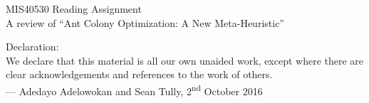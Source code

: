 \documentclass[a4paper,10pt]{minimal}
\begin{document}
\noindent
MIS40530 Reading Assignment
\\A review of ``Ant Colony Optimization: A New Meta-Heuristic''

\vspace{3in}
\noindent
Declaration:
\vspace{0.125in}
\noindent
\\We declare that this material is all our own unaided work, except where there are clear acknowledgements and references to the work of others.
\vspace{0.125in}
\\--- Adedayo Adelowokan and Sean Tully, 2\textsuperscript{nd} October 2016
\end{document}
